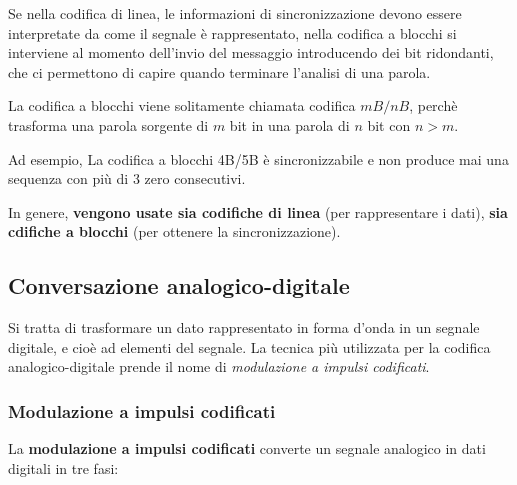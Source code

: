                 Se nella codifica di linea, le informazioni di sincronizzazione devono essere interpretate da come il segnale è rappresentato, nella codifica a blocchi si interviene al momento dell'invio del messaggio introducendo dei bit ridondanti, che ci permettono di capire quando terminare l'analisi di una parola.
                
                La codifica a blocchi viene solitamente chiamata codifica \(mB/nB\), perchè trasforma una parola sorgente di \(m\) bit in una parola di \(n\) bit con \(n>m\). 
                
                Ad esempio, La codifica a blocchi 4B/5B è sincronizzabile e non produce mai una sequenza con più di 3 zero consecutivi.
                
                \vspace{3mm}
                
                In genere, \textbf{vengono usate sia codifiche di linea} (per rappresentare i dati), \textbf{sia cdifiche a blocchi} (per ottenere la sincronizzazione).
            
    \subsection{Conversazione analogico-digitale}
    
        Si tratta di trasformare un dato rappresentato in forma d'onda in un segnale digitale, e cioè ad elementi del segnale. La tecnica più utilizzata per la codifica analogico-digitale prende il nome di \textit{modulazione a impulsi codificati}.
        
        \subsubsection{Modulazione a impulsi codificati}
        
            La \textbf{modulazione a impulsi codificati} converte un segnale analogico in dati digitali in tre fasi:
            
